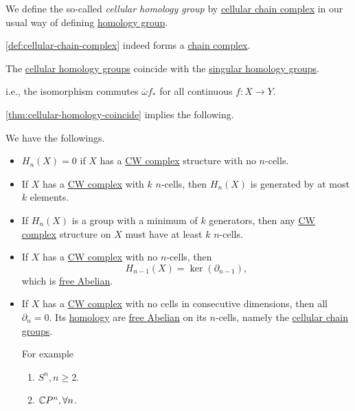 \begin{definition}\label{def:cellular-homology-group}
	We define the so-called \emph{cellular homology group} by \hyperref[def:cellular-chain-complex]{cellular chain complex} in our usual way of defining
	\hyperref[def:homology-group]{homology group}.
\end{definition}

\begin{theorem}
	\autoref{def:cellular-chain-complex} indeed forms a \hyperref[def:chain-complex]{chain complex}.
\end{theorem}

\begin{theorem}\label{thm:cellular-homology-coincide}
	The \hyperref[def:cellular-homology-group]{cellular homology groups} coincide with the \hyperref[def:singular-homology-group]{singular homology groups}.
\end{theorem}
\begin{note}
	i.e., the isomorphism commutes \(\overline{\omega} f_\ast\) for all continuous \(f\colon X\to Y\).
\end{note}

\autoref{thm:cellular-homology-coincide} implies the following.
\begin{corollary}
	We have the followings.
	\begin{itemize}
		\item \(H_n(X) = 0\) if \(X\) has a \hyperref[def:CW-Complex]{CW complex} structure with no \(n\)-cells.
		\item If \(X\) has a \hyperref[def:CW-Complex]{CW complex} with \(k\) \(n\)-cells, then \(H_n(X)\) is generated by at most \(k\) elements.
		\item If \(H_n(X)\) is a group with a minimum of \(k\) generators, then any \hyperref[def:CW-Complex]{CW complex} structure on \(X\) must have at least \(k\) \(n\)-cells.
		\item If \(X\) has a \hyperref[def:CW-Complex]{CW complex} with no \(n\)-cells, then
		      \[
			      H_{n-1}(X) = \ker (\partial _{n-1}),
		      \]
		      which is \hyperref[def:free-Abelian-group]{free Abelian}.
		\item If \(X\) has a \hyperref[def:CW-Complex]{CW complex} with no cells in consecutive dimensions, then all \(\partial _n=0\).
		      Its \hyperref[def:cellular-homology-group]{homology} are \hyperref[def:free-Abelian-group]{free Abelian} on its \(n\)-cells,
		      namely the \hyperref[def:cellular-chain-complex]{cellular chain groups}.
		      \par For example
		      \begin{enumerate}
			      \item \(S^n, n \geq 2\).
			      \item \(\mathbb{\MakeUppercase{c}} P^n, \forall n\).
		      \end{enumerate}
	\end{itemize}
\end{corollary}

